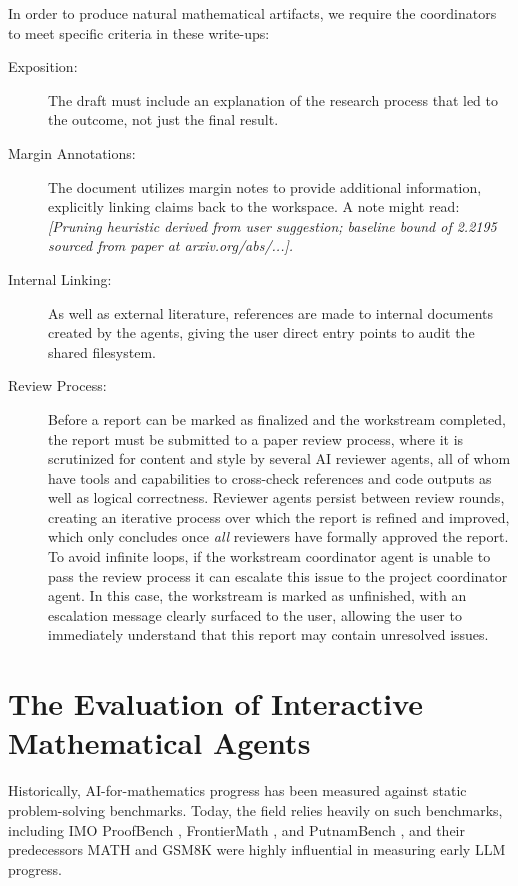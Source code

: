 \documentclass[11pt, a4paper, copyright, gdm]{google}
\newcommand{\user}[1]{\emph{#1}}
\begin{document}
In order to produce natural mathematical artifacts, we require the coordinators to meet specific criteria in these write-ups:

\begin{description}
\item[Exposition:] The draft must include an explanation of the research process that led to the outcome, not just the final result.

\item[Margin Annotations:] The document utilizes margin notes to provide additional information, explicitly linking claims back to the workspace.
A note might read: \user{[Pruning heuristic derived from user suggestion; baseline bound of 2.2195 sourced from paper at arxiv.org/abs/...].}

\item[Internal Linking:] As well as external literature, references are made to internal documents created by the agents, giving the user direct entry points to audit the shared filesystem.

\item[Review Process:] Before a report can be marked as finalized and the workstream completed, the report must be submitted to a paper review process, where it is scrutinized for content and style by several AI reviewer agents, all of whom have tools and capabilities to cross-check references and code outputs as well as logical correctness.
Reviewer agents persist between review rounds, creating an iterative process over which the report is refined and improved, which only concludes once \textit{all} reviewers have formally approved the report.
To avoid infinite loops, if the workstream coordinator agent is unable to pass the review process it can escalate this issue to the project coordinator agent.
In this case, the workstream is marked as unfinished, with an escalation message clearly surfaced to the user, allowing the user to immediately understand that this report may contain unresolved issues.
\end{description}

\section{The Evaluation of Interactive Mathematical Agents}
\label{sec:evaluation_paradigm}

Historically, AI-for-mathematics progress has been measured against static problem-solving benchmarks.
Today, the field relies heavily on such benchmarks, including IMO ProofBench \citep{luong2025imobench}, FrontierMath \citep{glazer2024}, and PutnamBench \citep{tsou2024putnambench}, and their predecessors MATH \citep{hendrycks2021math} and GSM8K \citep{cobbe2021gsm8k} were highly influential in measuring early LLM progress.
\end{document}

